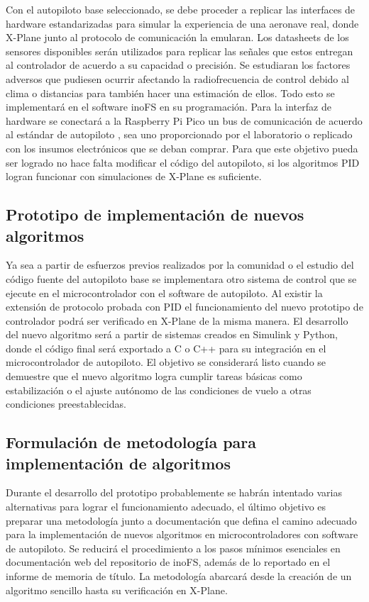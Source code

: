 Con el autopiloto base seleccionado, se debe proceder a replicar las interfaces de hardware estandarizadas para simular la experiencia de una aeronave real, donde X-Plane junto al protocolo de comunicación la emularan. Los datasheets de los sensores disponibles serán utilizados para replicar las señales que estos entregan al controlador de acuerdo a su capacidad o precisión. Se estudiaran los factores adversos que pudiesen ocurrir afectando la radiofrecuencia de control debido al clima o distancias para también hacer una estimación de ellos. Todo esto se implementará en el software inoFS \cite{inofs} en su programación. Para la interfaz de hardware se conectará a la Raspberry Pi Pico un bus de comunicación de acuerdo al estándar de autopiloto \cite{px4-bus}, sea uno proporcionado por el laboratorio o replicado con los insumos electrónicos que se deban comprar. Para que este objetivo pueda ser logrado no hace falta modificar el código del autopiloto, si los algoritmos PID logran funcionar con simulaciones de X-Plane es suficiente.

\subsection{Prototipo de implementación de nuevos algoritmos}

Ya sea a partir de esfuerzos previos realizados por la comunidad o el estudio del código fuente del autopiloto base se implementara otro sistema de control que se ejecute en el microcontrolador con el software de autopiloto. Al existir la extensión de protocolo probada con PID el funcionamiento del nuevo prototipo de controlador podrá ser verificado en X-Plane de la misma manera. El desarrollo del nuevo algoritmo será a partir de sistemas creados en Simulink y Python, donde el código final será exportado a C o C++ para su integración en el microcontrolador de autopiloto. El objetivo se considerará listo cuando se demuestre que el nuevo algoritmo logra cumplir tareas básicas como estabilización o el ajuste autónomo de las condiciones de vuelo a otras condiciones preestablecidas.

\subsection{Formulación de metodología para implementación de algoritmos}

Durante el desarrollo del prototipo probablemente se habrán intentado varias alternativas para lograr el funcionamiento adecuado, el último objetivo es preparar una metodología junto a documentación que defina el camino adecuado para la implementación de nuevos algoritmos en microcontroladores con software de autopiloto. Se reducirá el procedimiento a los pasos mínimos esenciales en documentación web del repositorio de inoFS, además de lo reportado en el informe de memoria de título. La metodología abarcará desde la creación de un algoritmo sencillo hasta su verificación en X-Plane.